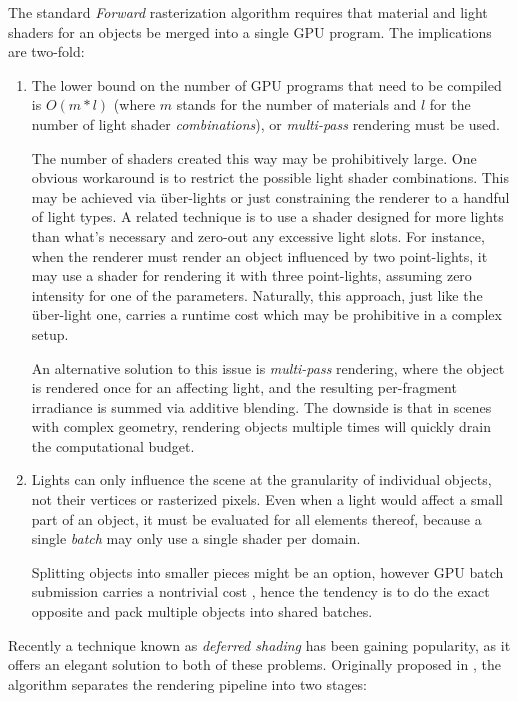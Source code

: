 The standard \emph{Forward} rasterization algorithm requires that material and light shaders for an objects be merged into a single GPU program. The implications are two-fold:
\begin{enumerate}
\item The lower bound on the number of GPU programs that need to be compiled is $O(m * l)$ (where $m$ stands for the number of materials and $l$ for the number of light shader \emph{combinations}), or \emph{multi-pass} rendering must be used.

The number of shaders created this way may be prohibitively large. One obvious workaround is to restrict the possible light shader combinations. This may be achieved via über-lights \cite{UberLights, UberLightsCg} or just constraining the renderer to a handful of light types. A related technique is to use a shader designed for more lights than what's necessary and zero-out any excessive light slots. For instance, when the renderer must render an object influenced by two point-lights, it may use a shader for rendering it with three point-lights, assuming zero intensity for one of the parameters. Naturally, this approach, just like the über-light one, carries a runtime cost which may be prohibitive in a complex setup.

An alternative solution to this issue is \emph{multi-pass} rendering, where the object is rendered once for an affecting light, and the resulting per-fragment irradiance is summed via additive blending. The downside is that in scenes with complex geometry, rendering objects multiple times will quickly drain the computational budget.

\item Lights can only influence the scene at the granularity of individual objects, not their vertices or rasterized pixels. Even when a light would affect a small part of an object, it must be evaluated for all elements thereof, because a single \emph{batch} may only use a single shader per domain.

Splitting objects into smaller pieces might be an option, however GPU batch submission carries a nontrivial cost \cite{BatchBatchBatch}, hence the tendency is to do the exact opposite and pack multiple objects into shared batches.
\end{enumerate}

Recently a technique known as \emph{deferred shading} has been gaining popularity, as it offers an elegant solution to both of these problems. Originally proposed in \citet{DeeringDeferred}, the algorithm separates the rendering pipeline into two stages:

